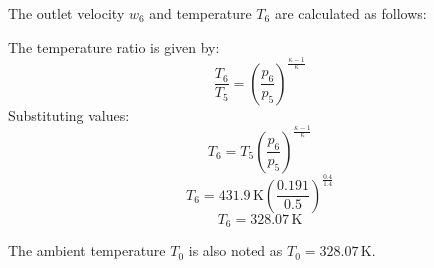 The outlet velocity \( w_6 \) and temperature \( T_6 \) are calculated as follows:  

The temperature ratio is given by:  
\[
\frac{T_6}{T_5} = \left( \frac{p_6}{p_5} \right)^{\frac{\kappa - 1}{\kappa}}
\]  
Substituting values:  
\[
T_6 = T_5 \left( \frac{p_6}{p_5} \right)^{\frac{\kappa - 1}{\kappa}}
\]  
\[
T_6 = 431.9 \, \text{K} \left( \frac{0.191}{0.5} \right)^{\frac{0.4}{1.4}}
\]  
\[
T_6 = 328.07 \, \text{K}
\]  

The ambient temperature \( T_0 \) is also noted as \( T_0 = 328.07 \, \text{K} \).